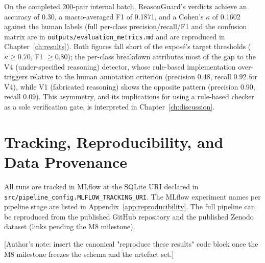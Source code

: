 On the completed 200-pair internal batch, ReasonGuard's verdicts achieve an
accuracy of 0.30, a macro-averaged F1 of 0.1871, and a Cohen's $\kappa$ of
0.1602 against the human labels (full per-class precision/recall/F1 and the
confusion matrix are in \texttt{outputs/evaluation\_metrics.md} and are
reproduced in Chapter~\ref{ch:results}). Both figures fall short of the
exposé's target thresholds ($\kappa \geq 0.70$, F1 $\geq 0.80$); the
per-class breakdown attributes most of the gap to the V4 (under-specified
reasoning) detector, whose rule-based implementation over-triggers relative
to the human annotation criterion (precision 0.48, recall 0.92 for V4),
while V1 (fabricated reasoning) shows the opposite pattern (precision 0.90,
recall 0.09). This asymmetry, and its implications for using a rule-based
checker as a sole verification gate, is interpreted in
Chapter~\ref{ch:discussion}.

\section{Tracking, Reproducibility, and Data Provenance}
\label{sec:reproducibility}

All runs are tracked in MLflow at the SQLite URI declared in
\texttt{src/pipeline\_config.MLFLOW\_TRACKING\_URI}. The MLflow experiment
names per pipeline stage are listed in Appendix~\ref{app:reproducibility}.
The full pipeline can be reproduced from the published GitHub repository
and the published Zenodo dataset (links pending the M8 milestone).

[Author's note: insert the canonical "reproduce these results" code block
once the M8 milestone freezes the schema and the artefact set.]
